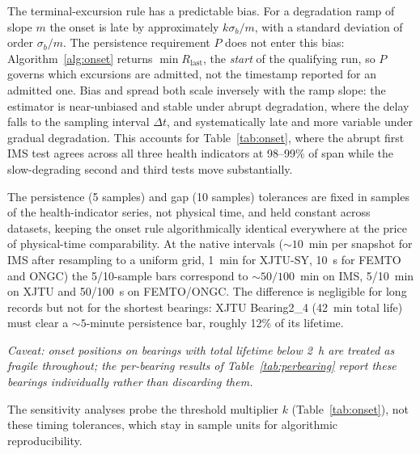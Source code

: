 \documentclass[IJPHM, 2026, 0]{PHMSociety}
\begin{document}
The terminal-excursion rule has a predictable bias. For a degradation ramp of slope $m$ the onset is late by approximately $k\sigma_b/m$, with a standard deviation of order $\sigma_b/m$. The persistence requirement $P$ does not enter this bias: Algorithm~\ref{alg:onset} returns $\min R_{\text{last}}$, the \emph{start} of the qualifying run, so $P$ governs which excursions are admitted, not the timestamp reported for an admitted one. Bias and spread both scale inversely with the ramp slope: the estimator is near-unbiased and stable under abrupt degradation, where the delay falls to the sampling interval $\Delta t$, and systematically late and more variable under gradual degradation. This accounts for Table~\ref{tab:onset}, where the abrupt first IMS test agrees across all three health indicators at 98--99\% of span while the slow-degrading second and third tests move substantially.

The persistence (5 samples) and gap (10 samples) tolerances are fixed in samples of the health-indicator series, not physical time, and held constant across datasets, keeping the onset rule algorithmically identical everywhere at the price of physical-time comparability. At the native intervals (${\sim}10$~min per snapshot for IMS after resampling to a uniform grid, 1~min for XJTU-SY, 10~s for FEMTO and ONGC) the 5/10-sample bars correspond to ${\sim}50/100$~min on IMS, 5/10~min on XJTU and 50/100~s on FEMTO/ONGC. The difference is negligible for long records but not for the shortest bearings: XJTU Bearing2\_4 (42~min total life) must clear a ${\sim}5$-minute persistence bar, roughly 12\% of its lifetime.

\medskip
\noindent\textit{Caveat: onset positions on bearings with total lifetime below 2~h are treated as fragile throughout; the per-bearing results of Table~\ref{tab:perbearing} report these bearings individually rather than discarding them.}
\medskip

\noindent The sensitivity analyses probe the threshold multiplier $k$ (Table~\ref{tab:onset}), not these timing tolerances, which stay in sample units for algorithmic reproducibility.
\end{document}
